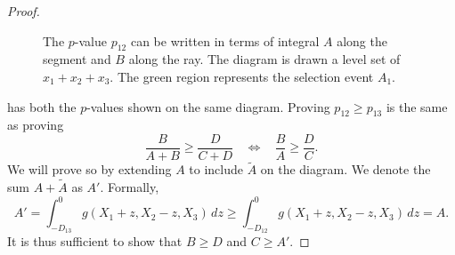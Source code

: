 \documentclass[11pt]{article}
\begin{document}
\begin{proof}
\begin{figure}[htbp]
\begin{center}
\end{center}
\caption{The $p$-value $p_{12}$ can be written in terms of integral $A$ along the segment and $B$ along the ray. The diagram is drawn a level set of $x_1 + x_2 + x_3$. The green region represents the selection event $A_1$.}
\label{fig:p-value}
\end{figure}

 has both the $p$-values shown on the same diagram. Proving $p_{12} \ge p_{13}$ is the same as proving
$$\frac{B}{A+B} \ge \frac{D}{C+D} ~~~~ \Longleftrightarrow ~~~~ \frac{B}{A} \ge \frac{D}{C}.$$
We will prove so by extending $A$ to include $\tilde{A}$ on the diagram. We denote the sum $A + \tilde{A}$ as $A'$. Formally,
\begin{equation}
A' = \int_{-D_{13}}^0 g\left(X_1 + z, X_2 - z, X_3\right) \,dz \ge \int_{-D_{12}}^0 g\left(X_1 + z, X_2 - z, X_3\right) \,dz = A.
\label{eqn:int_extension}
\end{equation}
It is thus sufficient to show that $B \ge D$ and $C \ge A'$.


\end{proof}
\end{document}
